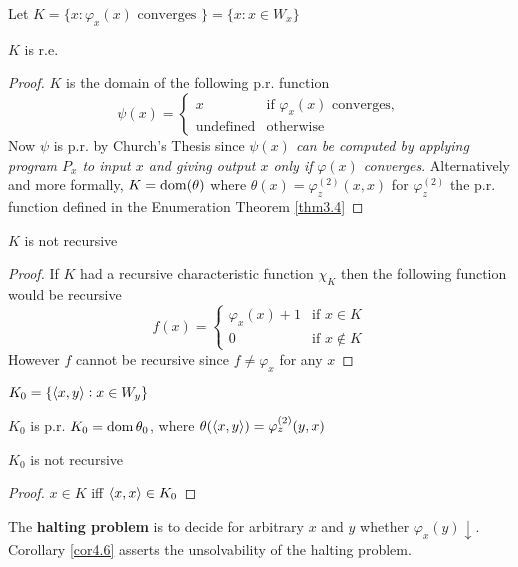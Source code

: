 \documentclass[11pt]{article}
\begin{document}
\begin{definition}[]
Let \(K=\{x:\varphi_x(x)\text{ converges }\}=\{x:x\in W_x\}\)
\end{definition}
\begin{proposition}[]
\(K\) is r.e.
\end{proposition}
\begin{proof}
\(K\) is the domain of the following p.r. function
\begin{equation*}
\psi(x)=
\begin{cases}
x&\text{if } \varphi_x(x)\text{ converges},\\
\text{undefined}&\text{otherwise}
\end{cases}
\end{equation*}
Now \(\psi\) is p.r. by Church's Thesis since \emph{\(\psi(x)\) can be computed by}
\emph{applying program \(P_x\) to input \(x\) and giving output \(x\) only if}
\emph{\(\varphi(x)\) converges}. Alternatively and more formally,
\(K=\operatorname{dom}(\theta)\) where \(\theta(x)=\varphi_z^{(2)}(x,x)\) for \(\varphi_z^{(2)}\)
the p.r. function defined in the Enumeration Theorem \ref{thm3.4}
\end{proof}
\begin{corollary}[]
\label{col1}
\(K\) is not recursive
\end{corollary}
\begin{proof}
If \(K\) had a recursive characteristic function \(\chi_K\) then the following
function would be recursive
\begin{equation*}
f(x)=
\begin{cases}
\varphi_x(x)+1&\text{if }x\in K\\
0&\text{if }x\not\in K
\end{cases}
\end{equation*}
However \(f\) cannot be recursive since \(f\neq\varphi_x\) for any \(x\)
\end{proof}
\begin{definition}[]
\(K_0=\{\langle x,y\rangle:x\in W_y\}\)
\end{definition}
\(K_0\) is p.r. \(K_0=\operatorname{dom}\theta_0\), where
\(\theta(\langle x,y\rangle)=\varphi^{(2)}_z(y,x)\)

\begin{corollary}[]
\label{cor4.6}
\(K_0\) is not recursive
\end{corollary}
\begin{proof}
\(x\in K\) iff \(\langle x,x\rangle\in K_0\)
\end{proof}

The \textbf{halting problem} is to decide for arbitrary \(x\) and \(y\) whether
\(\varphi_x(y)\downarrow\). Corollary \ref{cor4.6} asserts the unsolvability of the
halting problem.
\end{document}
